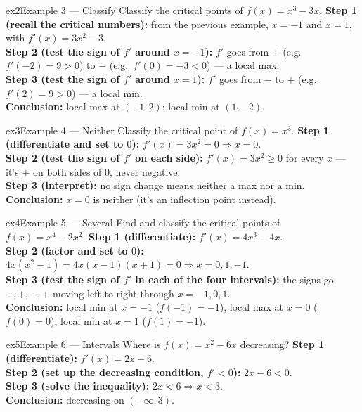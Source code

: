 \documentclass[11pt]{article}
\begin{document}
\begin{example}{ex2}{Example 3 --- Classify}
Classify the critical points of $f(x)=x^3-3x$.\soln
\textbf{Step 1 (recall the critical numbers):} from the previous example, $x=-1$ and $x=1$, with $f'(x)=3x^2-3$.\\[3pt]
\textbf{Step 2 (test the sign of $f'$ around $x=-1$):} $f'$ goes from $+$ (e.g.\ $f'(-2)=9>0$) to $-$ (e.g.\ $f'(0)=-3<0$) --- a local max.\\[3pt]
\textbf{Step 3 (test the sign of $f'$ around $x=1$):} $f'$ goes from $-$ to $+$ (e.g.\ $f'(2)=9>0$) --- a local min.\\[3pt]
\textbf{Conclusion:} local max at $(-1,2)$; local min at $(1,-2)$.
\end{example}

\begin{example}{ex3}{Example 4 --- Neither}
Classify the critical point of $f(x)=x^3$.\soln
\textbf{Step 1 (differentiate and set to $0$):} $f'(x)=3x^2=0\Rightarrow x=0$.\\[3pt]
\textbf{Step 2 (test the sign of $f'$ on each side):} $f'(x)=3x^2\ge0$ for every $x$ --- it's $+$ on both sides of $0$, never negative.\\[3pt]
\textbf{Step 3 (interpret):} no sign change means neither a max nor a min.\\[3pt]
\textbf{Conclusion:} $x=0$ is neither (it's an inflection point instead).
\end{example}

\begin{example}{ex4}{Example 5 --- Several}
Find and classify the critical points of $f(x)=x^4-2x^2$.\soln
\textbf{Step 1 (differentiate):} $f'(x)=4x^3-4x$.\\[3pt]
\textbf{Step 2 (factor and set to $0$):} $4x(x^2-1)=4x(x-1)(x+1)=0\Rightarrow x=0,1,-1$.\\[3pt]
\textbf{Step 3 (test the sign of $f'$ in each of the four intervals):} the signs go $-,+,-,+$ moving left to right through $x=-1,0,1$.\\[3pt]
\textbf{Conclusion:} local min at $x=-1$ ($f(-1)=-1$), local max at $x=0$ ($f(0)=0$), local min at $x=1$ ($f(1)=-1$).
\end{example}

\begin{example}{ex5}{Example 6 --- Intervals}
Where is $f(x)=x^2-6x$ decreasing?\soln
\textbf{Step 1 (differentiate):} $f'(x)=2x-6$.\\[3pt]
\textbf{Step 2 (set up the decreasing condition, $f'<0$):} $2x-6<0$.\\[3pt]
\textbf{Step 3 (solve the inequality):} $2x<6\Rightarrow x<3$.\\[3pt]
\textbf{Conclusion:} decreasing on $(-\infty,3)$.
\end{example}
\end{document}
